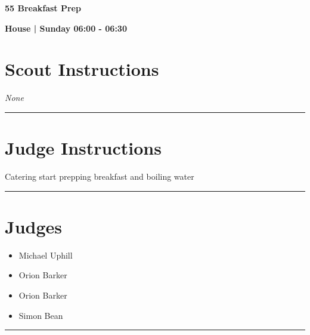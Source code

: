 \documentclass[10pt]{article}
\newcommand{\newtitle}[1]{\begin{center}{\Huge\bfseries #1 }\\ \vspace{5mm}\end{center}}
\newcommand{\newsubtitle}[1]{\begin{center}{\color{grey}\Large\bfseries #1 }\\ \vspace{5mm}\end{center}}
\begin{document}
	\vspace{1cm}


	\clearpage
		\newtitle{55 Breakfast Prep }
	\newsubtitle{House | Sunday 06:00 - 06:30}
		\setcounter{section}{54}
	\section*{Scout Instructions}
		\textit{None}
	
	\vspace{0.5cm}
	\hrule
	\vspace{0.5cm}

		\section*{Judge Instructions}
		Catering start prepping breakfast and boiling water
\vspace{0.5cm}
	\hrule
	\vspace{0.5cm}
		\section*{\faUsers \: Judges}

		

	\begin{multicols}{2}

		\begin{itemize}
									\item Michael Uphill
									\item Orion Barker
						\end{itemize}

		\vfill\null
		\columnbreak

		\begin{itemize}
									\item Orion Barker
									\item Simon Bean
						\end{itemize}

		\vfill\null

		\end{multicols}



			\vspace{0.5cm}
	\hrule
	\vspace{0.5cm}
\end{document}

